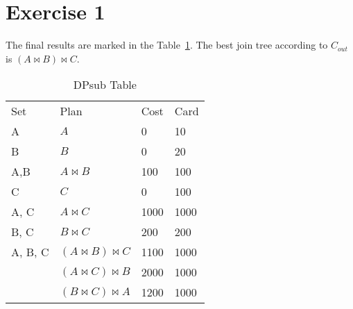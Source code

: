 \documentclass{scrartcl}
\newcommand{\join}{\Join}
\begin{document}
\section*{Exercise 1}

The final results are marked in the Table~\ref{exercise1}. The best join tree according to
$C_{out}$ is $(A \join B) \join C$.

\begin{table}[]
\centering
\caption{DPsub Table}
\label{exercise1}
\begin{tabular}{@{}llll@{}}
\rowcolor[HTML]{F8A102}
Set & Plan & Cost & Card \\
A & $A$ & 0 & 10 \\
B & $B$ & 0 & 20 \\
A,B & $A \join B$ & 100 & 100 \\
C & $C$ & 0 & 100 \\
A, C & $A \join C$ & 1000 & 1000 \\
B, C & $B \join C$ & 200 & 200 \\
\rowcolor[HTML]{FFCC67}
A, B, C & $(A \join B) \join C$ & 1100 & 1000 \\
\rowcolor[HTML]{FFCC67}
 & $(A \join C) \join B$ & 2000 & 1000 \\
\rowcolor[HTML]{FFCC67}
 & $(B \join C) \join A$ & 1200 & 1000 \\
\end{tabular}
\end{table}
\end{document}

